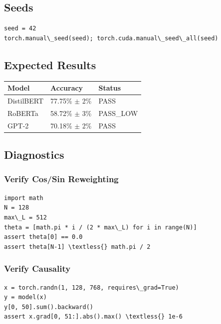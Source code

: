 \subsection{Seeds}

\begin{lstlisting}
seed = 42
torch.manual\_seed(seed); torch.cuda.manual\_seed\_all(seed)
\end{lstlisting}

\subsection{Expected Results}

\begin{table}[H]
\centering
\small
\begin{tabular}{lll}
\toprule
\textbf{Model} & \textbf{Accuracy} & \textbf{Status} \\
\midrule
DistilBERT & 77.75\% $\pm$ 2\% & PASS \\
RoBERTa & 58.72\% $\pm$ 3\% & PASS\_LOW \\
GPT-2 & 70.18\% $\pm$ 2\% & PASS \\
\bottomrule
\end{tabular}
\end{table}

\subsection{Diagnostics}

\subsubsection{Verify Cos/Sin Reweighting}

\begin{lstlisting}
import math
N = 128
max\_L = 512
theta = [math.pi * i / (2 * max\_L) for i in range(N)]
assert theta[0] == 0.0
assert theta[N-1] \textless{} math.pi / 2
\end{lstlisting}

\subsubsection{Verify Causality}

\begin{lstlisting}
x = torch.randn(1, 128, 768, requires\_grad=True)
y = model(x)
y[0, 50].sum().backward()
assert x.grad[0, 51:].abs().max() \textless{} 1e-6
\end{lstlisting}

